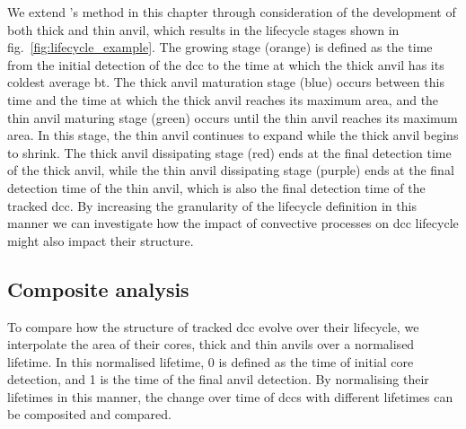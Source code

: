 We extend \citeauthor{futyan_deep_2007}'s method in this chapter through consideration of the development of both thick and thin anvil, which results in the lifecycle stages shown in fig.~\ref{fig:lifecycle_example}.
The growing stage (orange) is defined as the time from the initial detection of the \acrshort{dcc} to the time at which the thick anvil has its coldest average \acrshort{bt}.
The thick anvil maturation stage (blue) occurs between this time and the time at which the thick anvil reaches its maximum area, and the thin anvil maturing stage (green) occurs until the thin anvil reaches its maximum area.
In this stage, the thin anvil continues to expand while the thick anvil begins to shrink.
The thick anvil dissipating stage (red) ends at the final detection time of the thick anvil, while the thin anvil dissipating stage (purple) ends at the final detection time of the thin anvil, which is also the final detection time of the tracked \acrshort{dcc}.
By increasing the granularity of the lifecycle definition in this manner we can investigate how the impact of convective processes on \acrshort{dcc} lifecycle might also impact their structure.

\subsection{Composite analysis} \label{sec:composite_definition}

To compare how the structure of tracked \acrshort{dcc} evolve over their lifecycle, we interpolate the area of their cores, thick and thin anvils over a normalised lifetime.
In this normalised lifetime, 0 is defined as the time of initial core detection, and 1 is the time of the final anvil detection.
By normalising their lifetimes in this manner, the change over time of \acrshort{dcc}s with different lifetimes can be composited and compared.


